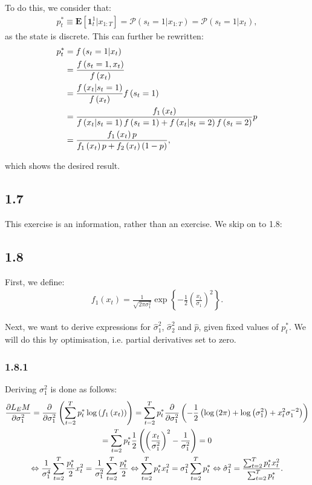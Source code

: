 \documentclass[11pt,a4paper,oneside]{article}
\newcommand{\LL}{\Leftrightarrow}
\newcommand{\lp}{\left(}
\newcommand{\rp}{\right)}
\newcommand{\rb}{\right]}
\newcommand{\lb}{\left[}
\newcommand{\lc}{\left\{}
\newcommand{\rc}{\right\}}
\newcommand{\ee}{\mathbf{E}}
\newcommand{\pp}{\mathcal{P}}
\newcommand{\ii}{\mathbf{1}}
\begin{document}
To do this, we consider that:
\begin{align}
    p_t^* \equiv \ee\lb \ii_t^1\vert x_{1:T}\rb = \pp\lp s_t = 1 \vert x_{1:T}\rp = \pp\lp s_t = 1 \vert x_t\rp,
\end{align}
as the state is discrete. This can further be rewritten:
\begin{align}
    p_t^* 
        &= f\lp s_t = 1\vert x_t\rp \notag \\
        &= \frac{f\lp s_t = 1, x_t\rp}{f\lp x_t\rp} \notag \\
        &= \frac{f\lp  x_t \vert s_t = 1\rp}{f\lp x_t\rp}f\lp s_t = 1\rp \notag \\
        &= \frac{f_1\lp x_t\rp}{f\lp x_t \vert s_t = 1 \rp f\lp s_t = 1\rp + f\lp x_t \vert s_t = 2\rp f\lp s_t = 2\rp} p \notag \\
        &= \frac{f_1\lp x_t\rp p}{f_1\lp x_t \rp p + f_2\lp x_t \rp \lp 1 - p\rp },
\end{align}

which shows the desired result.

\subsection{1.7}
This exercise is an information, rather than an exercise. We skip on to 1.8:

\subsection{1.8}
First, we define:
\begin{align}
    f_1\lp x_t\rp = \frac{1}{\sqrt{2 \pi \sigma_1^2}}\exp\lc - \frac{1}{2}\lp \frac{x_t}{\sigma_1}\rp^2\rc.
\end{align}

Next, we want to derive expressions for $\hat \sigma_1^2$, $\hat\sigma_2^2$ and $\hat p$, given fixed values of $p_t^*$. We will do this by optimisation, i.e. partial derivatives set to zero.

\subsubsection{1.8.1}
Deriving $\sigma_1^2$ is done as follows:
\begin{gather}
    \frac{\partial L_EM}{\partial \sigma_1^2} 
        = \frac{\partial }{\partial \sigma_1^2} \lp \sum_{t=2}^T p_t^* \log\lp f_1\lp x_t\rp \rp\rp 
        = \sum_{t=2}^T p_t^* \frac{\partial}{\partial \sigma_1^2} \lp - \frac{1}{2}\lp \log\lp 2 \pi\rp + \log\lp \sigma_1^2\rp + x_t^2 \sigma_1^{-2}\rp\rp  \notag \\
        = \sum_{t=2}^T p_t^* \frac{1}{2}\lp \lp \frac{x_t}{\sigma_1^2}\rp^2 - \frac{1}{\sigma_1^2}\rp = 0 \notag \\
        \LL \frac{1}{\sigma_1^4}\sum_{t=2}^T \frac{p_t^*}{2} x_t^2 = \frac{1}{\sigma_1^2}\sum_{t=2}^T\frac{p_t^*}{2} \LL \sum_{t=2}^T p_t^* x_t^2 = \sigma_1^2 \sum_{t=2}^T p_t^* \LL 
        \hat \sigma_1^2 = \frac{\sum_{t=2}^T p_t^* x_t^2}{\sum_{t=2}^T p_t^*}.
\end{gather}
\end{document}
